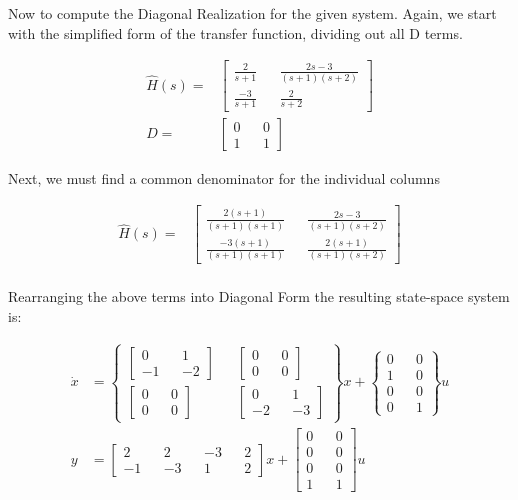 \documentclass[paper=a4,margin, fontsize=11pt]{scrartcl} %
\numberwithin{equation}{section} %
\numberwithin{figure}{section} %
\numberwithin{table}{section} %
\begin{document}
Now to compute the Diagonal Realization for the given system. Again, we start with the simplified form of the transfer function, dividing out all D terms.

\begin{align*}
\hat{H}(s)=&\begin{bmatrix}
\frac{2}{s+1} && \frac{2s-3}{(s+1)(s+2)} \\ \frac{-3}{s+1} && \frac{2}{s+2}\end{bmatrix}\\
D=&\begin{bmatrix} 0 && 0 \\ 1 && 1 \end{bmatrix}
\end{align*}

Next, we must find a common denominator for the individual columns

\begin{align*}
\hat{H}(s)=&\begin{bmatrix}
\frac{2(s+1)}{(s+1)(s+1)} && \frac{2s-3}{(s+1)(s+2)} \\ \frac{-3(s+1)}{(s+1)(s+1)} && \frac{2(s+1)}{(s+1)(s+2)}\end{bmatrix}\\
\end{align*}

Rearranging the above terms into Diagonal Form the resulting state-space system is:

\begin{align*}
\dot{x}&=\begin{Bmatrix}\begin{bmatrix}0 && 1\\-1 && -2\end{bmatrix} && \begin{bmatrix}0 && 0\\0 && 0\end{bmatrix}\\\begin{bmatrix}0 && 0\\0 && 0\end{bmatrix} && \begin{bmatrix}0 && 1\\-2 && -3 \end{bmatrix}\end{Bmatrix}x+\begin{Bmatrix}0 && 0\\1 && 0\\0 && 0\\0 &&1\end{Bmatrix}u\\
y&=\begin{bmatrix}2 && 2 && -3 && 2\\-1 && -3 && 1 && 2\end{bmatrix}x+\begin{bmatrix}0 && 0\\0 && 0\\0 && 0\\1 &&1\end{bmatrix}u
\end{align*}
\\
\\
\\
\end{document}
